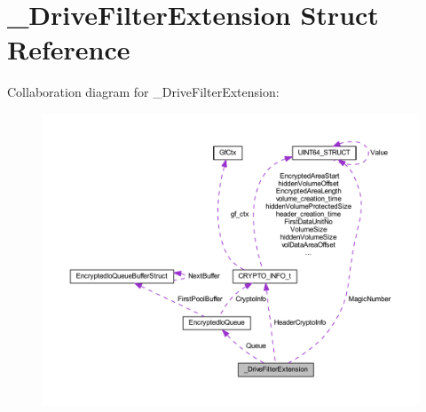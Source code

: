 \hypertarget{struct___drive_filter_extension}{}\section{\+\_\+\+Drive\+Filter\+Extension Struct Reference}
\label{struct___drive_filter_extension}


Collaboration diagram for \+\_\+\+Drive\+Filter\+Extension\+:
\nopagebreak
\begin{figure}[H]
\begin{center}
\leavevmode
\includegraphics[width=350pt]{struct___drive_filter_extension__coll__graph}
\end{center}
\end{figure}
